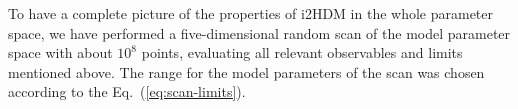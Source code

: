 \documentclass[12pt,a4paper]{article}
\providecommand{\DIFaddend}{} %
\providecommand{\DIFdelbegin}{} %
\begin{document}
\DIFaddend To have a complete picture of the properties of i2HDM in the whole parameter space, we have performed a
five-dimensional random scan of the model parameter space with about $10^8$ points, evaluating all relevant
observables and limits mentioned above. The range for 
the model parameters of the scan was chosen according to the Eq.~(\ref{eq:scan-limits}).

\DIFdelbegin %
\end{document}
